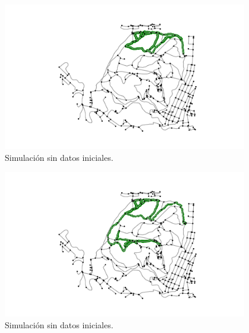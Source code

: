 \begin{figure}[h]
\begin{center}
\includegraphics[width=0.95\textwidth]{./Imagenes/data-simulation/track3.png}
\caption{Simulación sin datos iniciales.}
\end{center}
\label{figure:Simulation3}
\end{figure}

\begin{figure}[h]
\begin{center}
\includegraphics[width=0.95\textwidth]{./Imagenes/data-simulation/track4.png}
\caption{Simulación sin datos iniciales.}
\end{center}
\label{figure:Simulation4}
\end{figure}
\newpage

